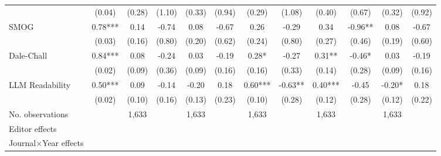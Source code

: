 \begin{table}
\begin{threeparttable}
\begin{tabular}{p{3cm}S@{}S@{}S@{}S@{}S@{}S@{}S@{}S@{}S@{}S@{}S@{}}
                                          &      (0.04)   &      (0.28)   &      (1.10)   &      (0.33)   &      (0.94)   &      (0.29)   &      (1.08)   &      (0.40)   &      (0.67)   &      (0.32)   &      (0.92)   \\
            SMOG                          &        0.78***&        0.14   &       -0.74   &        0.08   &       -0.67   &        0.26   &       -0.29   &        0.34   &       -0.96** &        0.08   &       -0.67   \\
                                          &      (0.03)   &      (0.16)   &      (0.80)   &      (0.20)   &      (0.62)   &      (0.24)   &      (0.80)   &      (0.27)   &      (0.46)   &      (0.19)   &      (0.60)   \\
            Dale-Chall                    &        0.84***&        0.08   &       -0.24   &        0.03   &       -0.19   &        0.28*  &       -0.27   &        0.31** &       -0.46*  &        0.03   &       -0.19   \\
                                          &      (0.02)   &      (0.09)   &      (0.36)   &      (0.09)   &      (0.16)   &      (0.16)   &      (0.33)   &      (0.14)   &      (0.28)   &      (0.09)   &      (0.16)   \\
            LLM Readability        &        0.50***&        0.09   &       -0.14   &       -0.20   &        0.18   &        0.60***&       -0.63** &        0.40***&       -0.45   &       -0.20*  &        0.18   \\
                                          &      (0.02)   &      (0.10)   &      (0.16)   &      (0.13)   &      (0.23)   &      (0.10)   &      (0.28)   &      (0.12)   &      (0.28)   &      (0.12)   &      (0.22)   \\
            \midrule
            No. observations              &               &       1,633   &               &       1,633   &               &       1,633   &               &       1,633   &               &       1,633   &               \\
            \midrule
            Editor effects        &               &           {}   &               &           {}   &               &           {}   &               &           {}   &               &               &               \\
            Journal\(\times\)Year effects          &               &           {}   &               &           {}   &               &           {}   &               &           {}   &               &               &               \\

\end{tabular}
\end{threeparttable}
\end{table}
